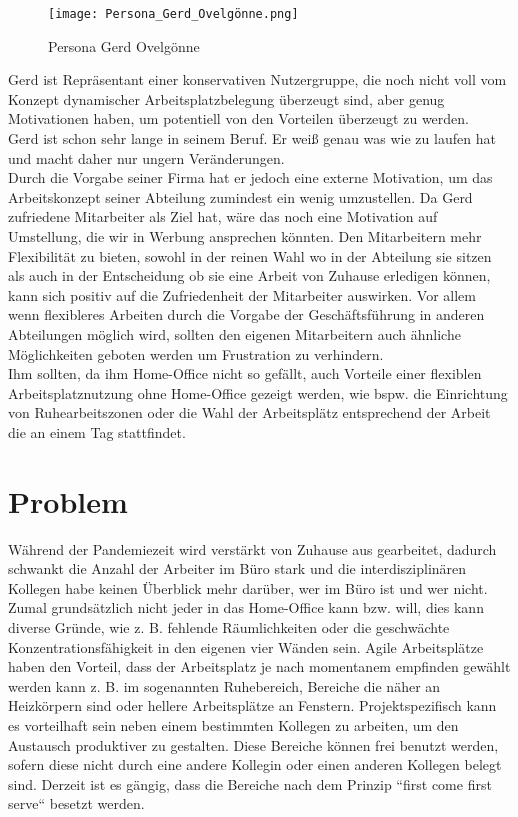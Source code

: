 \pagebreak

\begin{figure}[!h]
    \centering
    \texttt{[image: Persona\_Gerd\_Ovelgönne.png]}
    \caption{Persona Gerd Ovelgönne}
    \label{fig:PersonaGerdOvelgönne}
\end{figure}

Gerd ist Repräsentant einer konservativen Nutzergruppe, die noch nicht voll vom Konzept dynamischer Arbeitsplatzbelegung überzeugt sind, aber genug Motivationen haben, um potentiell von den Vorteilen überzeugt zu werden.
\\
Gerd ist schon sehr lange in seinem Beruf.
Er weiß genau was wie zu laufen hat und macht daher nur ungern Veränderungen.
\\
Durch die Vorgabe seiner Firma hat er jedoch eine externe Motivation, um das Arbeitskonzept seiner Abteilung zumindest ein wenig umzustellen.
Da Gerd zufriedene Mitarbeiter als Ziel hat, wäre das noch eine Motivation auf Umstellung, die wir in Werbung ansprechen könnten.
Den Mitarbeitern mehr Flexibilität zu bieten, sowohl in der reinen Wahl wo in der Abteilung sie sitzen als auch in der Entscheidung ob sie eine Arbeit von Zuhause erledigen können, kann sich positiv auf die Zufriedenheit der Mitarbeiter auswirken.
Vor allem wenn flexibleres Arbeiten durch die Vorgabe der Geschäftsführung in anderen Abteilungen möglich wird, sollten den eigenen Mitarbeitern auch ähnliche Möglichkeiten geboten werden um Frustration zu verhindern.
\\
Ihm sollten, da ihm Home-Office nicht so gefällt, auch Vorteile einer flexiblen Arbeitsplatznutzung ohne Home-Office gezeigt werden, wie bspw. die Einrichtung von Ruhearbeitszonen oder die Wahl der Arbeitsplätz entsprechend der Arbeit die an einem Tag stattfindet.


\section{Problem}
Während der Pandemiezeit wird verstärkt von Zuhause aus gearbeitet, dadurch schwankt die Anzahl der Arbeiter im Büro stark und die interdisziplinären Kollegen habe keinen Überblick mehr darüber, wer im Büro ist und wer nicht.
Zumal grundsätzlich nicht jeder in das Home-Office kann bzw. will, dies kann diverse Gründe, wie z. B. fehlende Räumlichkeiten oder die geschwächte Konzentrationsfähigkeit in den eigenen vier Wänden sein.
Agile Arbeitsplätze haben den Vorteil, dass der Arbeitsplatz je nach momentanem empfinden gewählt werden kann z. B. im sogenannten Ruhebereich, Bereiche die näher an Heizkörpern sind oder hellere Arbeitsplätze an Fenstern.
Projektspezifisch kann es vorteilhaft sein neben einem bestimmten Kollegen zu arbeiten, um den Austausch produktiver zu gestalten.
Diese Bereiche können frei benutzt werden, sofern diese nicht durch eine andere Kollegin oder einen anderen Kollegen belegt sind.
Derzeit ist es gängig, dass die Bereiche nach dem Prinzip “first come first serve“ besetzt werden. 

